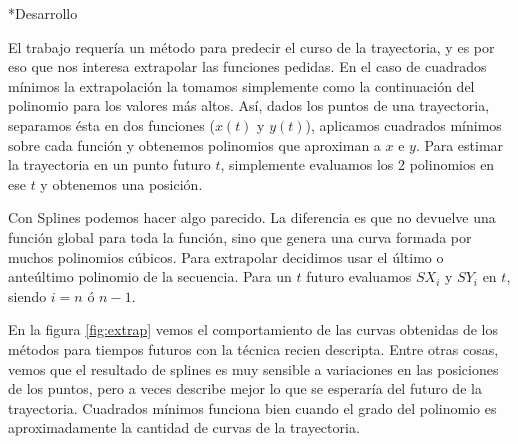 \documentclass[12pt,titlepage]{article}
\newenvironment{usection}[1]{\newpage\begin{section}*{#1}	\addcontentsline{toc}{section}{#1}}{\end{section}}
\begin{document}
\begin{usection}{Desarrollo}
		El trabajo requería un método para predecir el curso de la trayectoria, y es por eso que nos interesa extrapolar las funciones pedidas.
		En el caso de cuadrados mínimos la extrapolación la tomamos simplemente como la continuación del polinomio para los valores más altos.
		Así, dados los puntos de una trayectoria, separamos ésta en dos funciones ($x(t)$ y $y(t)$), aplicamos cuadrados mínimos sobre cada función y obtenemos polinomios que aproximan a $x$ e $y$.
		Para estimar la trayectoria en un punto futuro $t$, simplemente evaluamos los 2 polinomios en ese $t$ y obtenemos una posición.
		
		Con Splines podemos hacer algo parecido. La diferencia es que no devuelve una función global para toda la función, sino que genera una curva formada por muchos polinomios cúbicos.
		Para extrapolar decidimos usar el último o anteúltimo polinomio de la secuencia. Para un $t$ futuro evaluamos $SX_i$ y $SY_i$ en $t$, siendo $i=n$ ó $n-1$.
		
		En la figura \ref{fig:extrap} vemos el comportamiento de las curvas obtenidas de los métodos para tiempos futuros con la técnica recien descripta.
		Entre otras cosas, vemos que el resultado de splines es muy sensible a variaciones en las posiciones de los puntos, pero a veces describe mejor lo que se esperaría del futuro de la trayectoria.
		Cuadrados mínimos funciona bien cuando el grado del polinomio es aproximadamente la cantidad de curvas de la trayectoria.


\end{usection}
\end{document}
